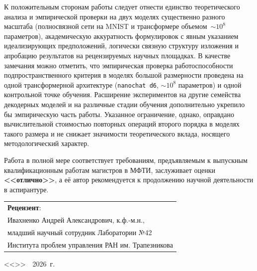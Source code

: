 \documentclass[11pt,a4paper]{extarticle}
\begin{document}
К положительным сторонам работы следует отнести единство теоретического анализа и эмпирической проверки на двух моделях существенно разного масштаба (полносвязной сети на MNIST и трансформере объемом~${\sim 10^8}$ параметров), академическую аккуратность формулировок с явным указанием идеализирующих предположений, логически связную структуру изложения и апробацию результатов на рецензируемых научных площадках. В качестве замечания можно отметить, что эмпирическая проверка работоспособности подпространственного критерия в моделях большой размерности проведена на одной трансформерной архитектуре (\texttt{nanochat~d6}, ${\sim 10^8}$ параметров) и одной контрольной точке обучения. Расширение экспериментов на другие семейства декодерных моделей и на различные стадии обучения дополнительно укрепило бы эмпирическую часть работы. Указанное ограничение, однако, оправдано вычислительной стоимостью повторных операций второго порядка в моделях такого размера и не снижает значимости теоретического вклада, носящего методологический характер.

Работа в полной мере соответствует требованиям, предъявляемым к выпускным квалификационным работам магистров в МФТИ, заслуживает оценки \textbf{<<отлично>>}, а её автор рекомендуется к продолжению научной деятельности в аспирантуре.

\vspace{0.5em}

\begin{flushleft}
\hfill\begin{tabular}{l}
\textbf{Рецензент}:\\
Ивахненко Андрей Александрович, к.ф.-м.н.,\\
младший научный сотрудник Лаборатории №42\\
Института проблем управления РАН им. Трапезникова
\end{tabular}
\end{flushleft}

\vfill

\begin{flushright}
    <<\underline{\hspace{1cm}}>>\ \underline{\hspace{2.5cm}}\ 2026~г.
\end{flushright}
\end{document}
